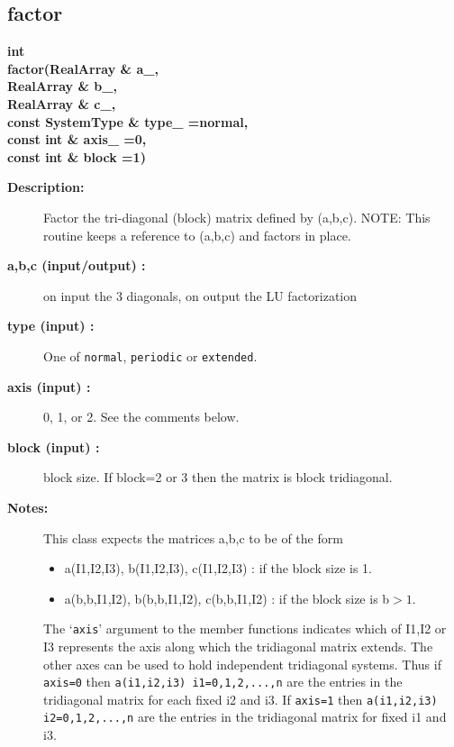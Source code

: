\subsection{factor}
 
\begin{flushleft} \textbf{%
int  \\ 
\settowidth{\TridiagonalSolverIncludeArgIndent}{factor(}%
factor(RealArray \& a\_, \\ 
\hspace{\TridiagonalSolverIncludeArgIndent}RealArray \& b\_, \\ 
\hspace{\TridiagonalSolverIncludeArgIndent}RealArray \& c\_, \\ 
\hspace{\TridiagonalSolverIncludeArgIndent}const SystemType \& type\_  =normal,\\ 
\hspace{\TridiagonalSolverIncludeArgIndent}const int \& axis\_  =0,\\ 
\hspace{\TridiagonalSolverIncludeArgIndent}const int \& block  =1)
}\end{flushleft}
\begin{description}
\item[{\bf Description:}] 
   Factor the tri-diagonal (block) matrix defined by (a,b,c).
   NOTE: This routine keeps a reference to (a,b,c) and factors in place. 
\item[{\bf a,b,c (input/output) :}]  on input the 3 diagonals, on output the LU factorization
\item[{\bf type (input) :}]  One of {\tt normal}, {\tt periodic} or {\tt extended}.
\item[{\bf axis (input) :}]  0, 1, or 2. See the comments below.
\item[{\bf block (input) :}]  block size. If block=2 or 3 then the matrix is block tridiagonal.
\item[{\bf Notes:}] 
 This class expects the matrices a,b,c to be of the form
 \begin{itemize}
  \item a(I1,I2,I3), b(I1,I2,I3), c(I1,I2,I3) : if the block size is 1.
  \item a(b,b,I1,I2), b(b,b,I1,I2), c(b,b,I1,I2) : if the block size is b$>1$.
 \end{itemize}
  The `{\tt axis}' argument to the member functions indicates which of I1,I2 or I3
  represents the axis along which the tridiagonal matrix extends. The other axes
  can be used to hold independent tridiagonal systems. Thus if {\tt axis=0} then
  {\tt a(i1,i2,i3) i1=0,1,2,...,n} are the entries in the tridiagonal matrix for
  each fixed i2 and i3. If {\tt axis=1} then {\tt a(i1,i2,i3) i2=0,1,2,...,n} 
 are the entries in the tridiagonal matrix for fixed i1 and i3.
\end{description}
